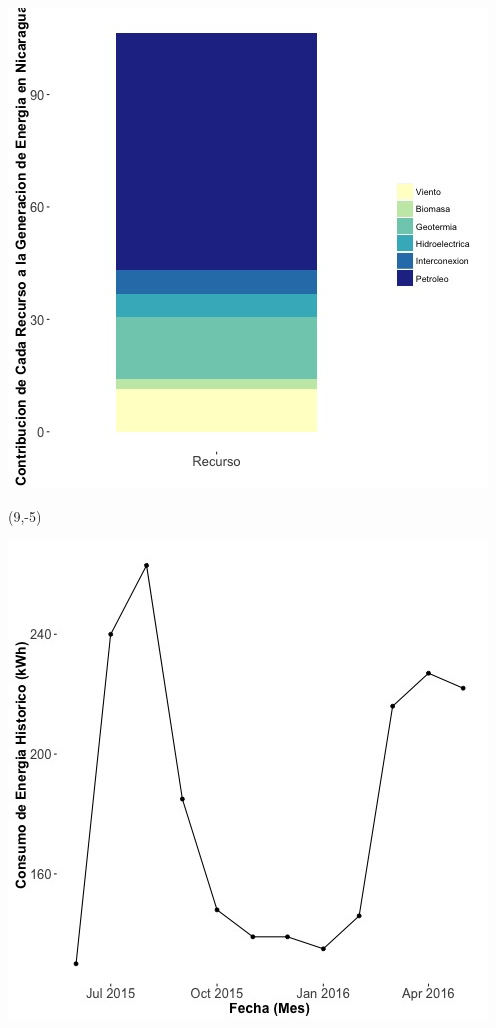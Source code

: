 \documentclass{article}\usepackage[]{graphicx}\usepackage[]{color}
\newenvironment{knitrout}{}{} %
\begin{document}
\begin{knitrout}
\color{fgcolor}
\includegraphics[scale=0.65]{figure/gridplot2.jpg} 
\end{knitrout}

 \begin{textblock}{1}(9,-5)
\begin{minipage}{20em}
\begingroup

\endgroup
\end{minipage}
\end{textblock}

\begin{knitrout}
\color{fgcolor}
\includegraphics[scale=0.65]{figure/A19_historico_energia} 
\end{knitrout}
\end{document}
